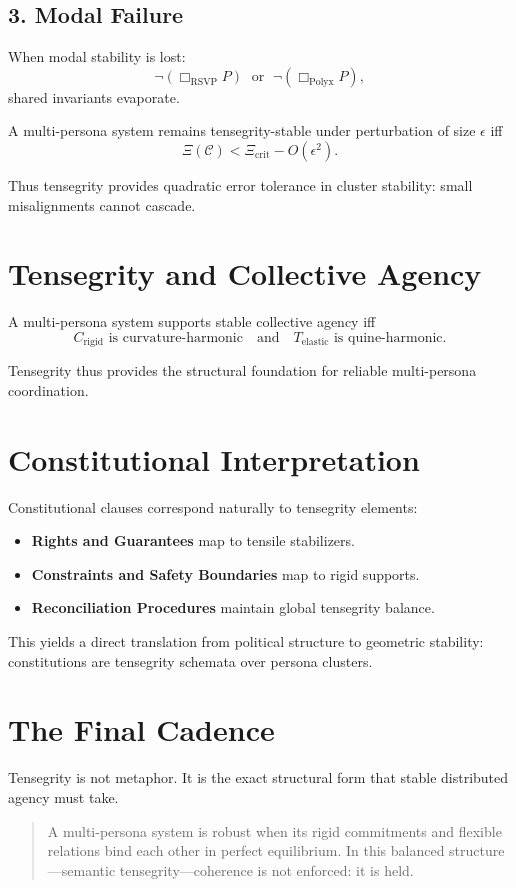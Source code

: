 \subsection{3. Modal Failure}

When modal stability is lost:
\[
\neg(\Box_{\mathrm{RSVP}}P) \;\text{ or }\; \neg(\Box_{\mathrm{Polyx}}P),
\]
shared invariants evaporate.

\begin{theorem}
A multi-persona system remains tensegrity-stable under perturbation of size $\epsilon$
iff
\[
\Xi(\mathcal{C})
< \Xi_{\mathrm{crit}}
- O(\epsilon^2).
\]
\end{theorem}

Thus tensegrity provides quadratic error tolerance in cluster stability:  
small misalignments cannot cascade.


\section{Tensegrity and Collective Agency}

\begin{theorem}
A multi-persona system supports stable collective agency iff
\[
C_{\mathrm{rigid}} \text{ is curvature-harmonic}
\quad\text{and}\quad
T_{\mathrm{elastic}} \text{ is quine-harmonic}.
\]
\end{theorem}

Tensegrity thus provides the structural foundation for reliable multi-persona coordination.


\section{Constitutional Interpretation}

Constitutional clauses correspond naturally to tensegrity elements:

\begin{itemize}
    \item \textbf{Rights and Guarantees} map to tensile stabilizers.
    \item \textbf{Constraints and Safety Boundaries} map to rigid supports.
    \item \textbf{Reconciliation Procedures} maintain global tensegrity balance.
\end{itemize}

This yields a direct translation from political structure to geometric stability:
constitutions are tensegrity schemata over persona clusters.


\section{The Final Cadence}

Tensegrity is not metaphor.  
It is the exact structural form that stable distributed agency must take.

\begin{quote}
A multi-persona system is robust when its rigid commitments  
and flexible relations bind each other in perfect equilibrium.  
In this balanced structure—semantic tensegrity—coherence is not enforced:  
it is held.
\end{quote}
